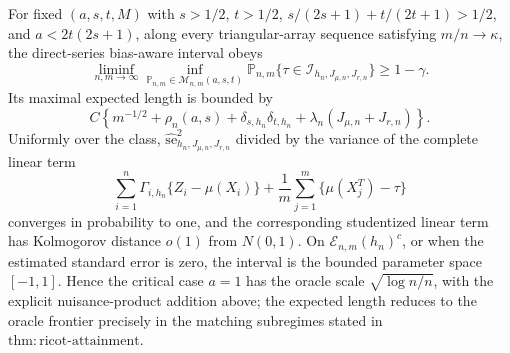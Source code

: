 For fixed \((a,s,t,M)\) with \(s>1/2\), \(t>1/2\), \(s/(2s+1)+t/(2t+1)>1/2\), and \(a<2t(2s+1)\), along every triangular-array sequence satisfying \(m/n\to\kappa\), the direct-series bias-aware interval obeys
\[
\liminf_{n,m\to\infty}\inf_{\mathbb P_{n,m}\in\mathcal M_{n,m}(a,s,t)}
\mathbb P_{n,m}\{\tau\in\mathcal I_{h_n,J_{\mu,n},J_{r,n}}\}\ge1-\gamma.
\]
Its maximal expected length is bounded by
\[
C\left\{
m^{-1/2}+\rho_n(a,s)
+\delta_{s,h_n}\delta_{t,h_n}
+\lambda_n(J_{\mu,n}+J_{r,n})
\right\}.
\]
Uniformly over the class, \(\widehat{\mathrm{se}}_{h_n,J_{\mu,n},J_{r,n}}^2\) divided by the variance of the complete linear term
\[
\sum_{i=1}^n\Gamma_{i,h_n}\{Z_i-\mu(X_i)\}
+\frac1m\sum_{j=1}^m\{\mu(X_j^T)-\tau\}
\]
converges in probability to one, and the corresponding studentized linear term has Kolmogorov distance \(o(1)\) from \(N(0,1)\).  On \(\mathcal E_{n,m}(h_n)^c\), or when the estimated standard error is zero, the interval is the bounded parameter space \([-1,1]\).  Hence the critical case \(a=1\) has the oracle scale \(\sqrt{\log n/n}\), with the explicit nuisance-product addition above; the expected length reduces to the oracle frontier precisely in the matching subregimes stated in \(\mathrm{thm:ricot\text{-}attainment}\).